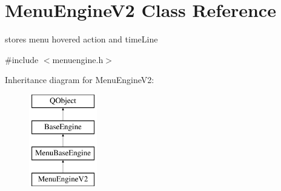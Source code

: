 \hypertarget{class_menu_engine_v2}{}\section{Menu\+Engine\+V2 Class Reference}
\label{class_menu_engine_v2}


stores menu hovered action and time\+Line  




{\ttfamily \#include $<$menuengine.\+h$>$}

Inheritance diagram for Menu\+Engine\+V2\+:\begin{figure}[H]
\begin{center}
\leavevmode
\includegraphics[height=4.000000cm]{class_menu_engine_v2}
\end{center}
\end{figure}
